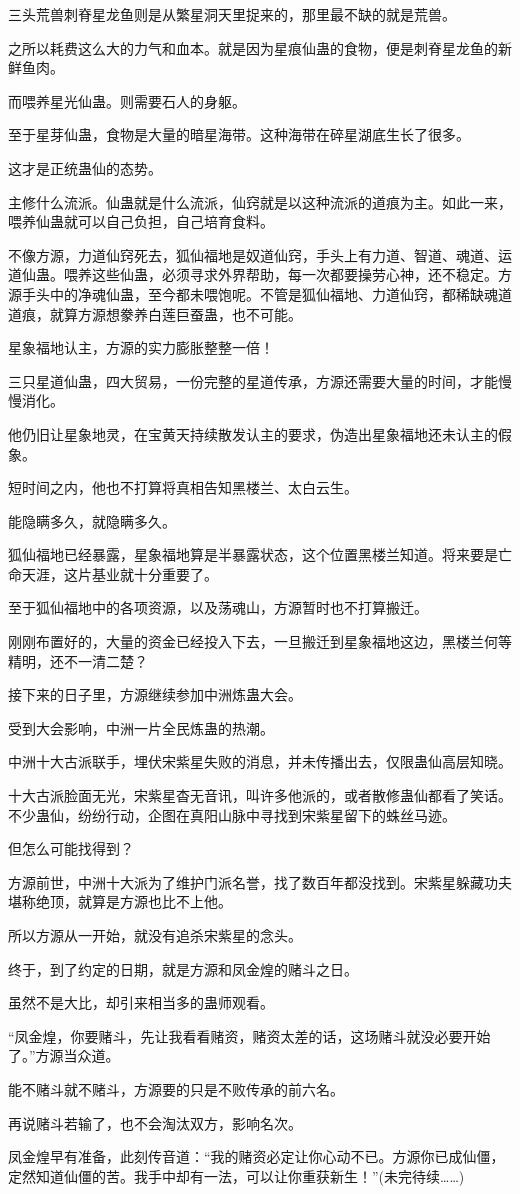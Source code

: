 \begin{this_body}
三头荒兽刺脊星龙鱼则是从繁星洞天里捉来的，那里最不缺的就是荒兽。

之所以耗费这么大的力气和血本。就是因为星痕仙蛊的食物，便是刺脊星龙鱼的新鲜鱼肉。

而喂养星光仙蛊。则需要石人的身躯。

至于星芽仙蛊，食物是大量的暗星海带。这种海带在碎星湖底生长了很多。

这才是正统蛊仙的态势。

主修什么流派。仙蛊就是什么流派，仙窍就是以这种流派的道痕为主。如此一来，喂养仙蛊就可以自己负担，自己培育食料。

不像方源，力道仙窍死去，狐仙福地是奴道仙窍，手头上有力道、智道、魂道、运道仙蛊。喂养这些仙蛊，必须寻求外界帮助，每一次都要操劳心神，还不稳定。方源手头中的净魂仙蛊，至今都未喂饱呢。不管是狐仙福地、力道仙窍，都稀缺魂道道痕，就算方源想豢养白莲巨蚕蛊，也不可能。

星象福地认主，方源的实力膨胀整整一倍！

三只星道仙蛊，四大贸易，一份完整的星道传承，方源还需要大量的时间，才能慢慢消化。

他仍旧让星象地灵，在宝黄天持续散发认主的要求，伪造出星象福地还未认主的假象。

短时间之内，他也不打算将真相告知黑楼兰、太白云生。

能隐瞒多久，就隐瞒多久。

狐仙福地已经暴露，星象福地算是半暴露状态，这个位置黑楼兰知道。将来要是亡命天涯，这片基业就十分重要了。

至于狐仙福地中的各项资源，以及荡魂山，方源暂时也不打算搬迁。

刚刚布置好的，大量的资金已经投入下去，一旦搬迁到星象福地这边，黑楼兰何等精明，还不一清二楚？

接下来的日子里，方源继续参加中洲炼蛊大会。

受到大会影响，中洲一片全民炼蛊的热潮。

中洲十大古派联手，埋伏宋紫星失败的消息，并未传播出去，仅限蛊仙高层知晓。

十大古派脸面无光，宋紫星杳无音讯，叫许多他派的，或者散修蛊仙都看了笑话。不少蛊仙，纷纷行动，企图在真阳山脉中寻找到宋紫星留下的蛛丝马迹。

但怎么可能找得到？

方源前世，中洲十大派为了维护门派名誉，找了数百年都没找到。宋紫星躲藏功夫堪称绝顶，就算是方源也比不上他。

所以方源从一开始，就没有追杀宋紫星的念头。

终于，到了约定的日期，就是方源和凤金煌的赌斗之日。

虽然不是大比，却引来相当多的蛊师观看。

“凤金煌，你要赌斗，先让我看看赌资，赌资太差的话，这场赌斗就没必要开始了。”方源当众道。

能不赌斗就不赌斗，方源要的只是不败传承的前六名。

再说赌斗若输了，也不会淘汰双方，影响名次。

凤金煌早有准备，此刻传音道：“我的赌资必定让你心动不已。方源你已成仙僵，定然知道仙僵的苦。我手中却有一法，可以让你重获新生！”(未完待续……)

\end{this_body}

